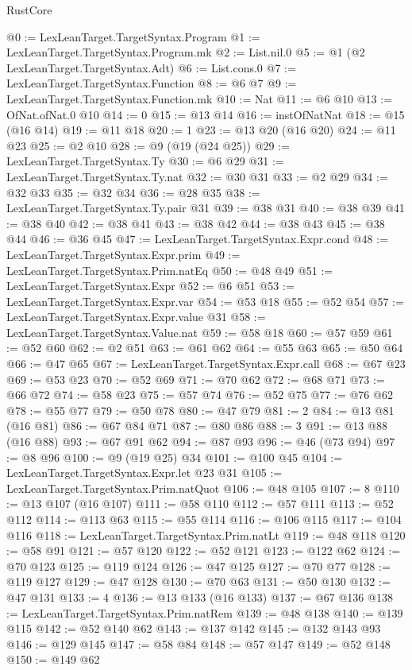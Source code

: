 \begin{lexlean}{RustCore}
\begin{coremodule}
@0 := LexLeanTarget.TargetSyntax.Program
@1 := LexLeanTarget.TargetSyntax.Program.mk
@2 := List.nil.{0}
@5 := @1 (@2 LexLeanTarget.TargetSyntax.Adt)
@6 := List.cons.{0}
@7 := LexLeanTarget.TargetSyntax.Function
@8 := @6 @7
@9 := LexLeanTarget.TargetSyntax.Function.mk
@10 := Nat
@11 := @6 @10
@13 := OfNat.ofNat.{0} @10
@14 := 0
@15 := @13 @14
@16 := instOfNatNat
@18 := @15 (@16 @14)
@19 := @11 @18
@20 := 1
@23 := @13 @20 (@16 @20)
@24 := @11 @23
@25 := @2 @10
@28 := @9 (@19 (@24 @25))
@29 := LexLeanTarget.TargetSyntax.Ty
@30 := @6 @29
@31 := LexLeanTarget.TargetSyntax.Ty.nat
@32 := @30 @31
@33 := @2 @29
@34 := @32 @33
@35 := @32 @34
@36 := @28 @35
@38 := LexLeanTarget.TargetSyntax.Ty.pair @31
@39 := @38 @31
@40 := @38 @39
@41 := @38 @40
@42 := @38 @41
@43 := @38 @42
@44 := @38 @43
@45 := @38 @44
@46 := @36 @45
@47 := LexLeanTarget.TargetSyntax.Expr.cond
@48 := LexLeanTarget.TargetSyntax.Expr.prim
@49 := LexLeanTarget.TargetSyntax.Prim.natEq
@50 := @48 @49
@51 := LexLeanTarget.TargetSyntax.Expr
@52 := @6 @51
@53 := LexLeanTarget.TargetSyntax.Expr.var
@54 := @53 @18
@55 := @52 @54
@57 := LexLeanTarget.TargetSyntax.Expr.value @31
@58 := LexLeanTarget.TargetSyntax.Value.nat
@59 := @58 @18
@60 := @57 @59
@61 := @52 @60
@62 := @2 @51
@63 := @61 @62
@64 := @55 @63
@65 := @50 @64
@66 := @47 @65
@67 := LexLeanTarget.TargetSyntax.Expr.call
@68 := @67 @23
@69 := @53 @23
@70 := @52 @69
@71 := @70 @62
@72 := @68 @71
@73 := @66 @72
@74 := @58 @23
@75 := @57 @74
@76 := @52 @75
@77 := @76 @62
@78 := @55 @77
@79 := @50 @78
@80 := @47 @79
@81 := 2
@84 := @13 @81 (@16 @81)
@86 := @67 @84 @71
@87 := @80 @86
@88 := 3
@91 := @13 @88 (@16 @88)
@93 := @67 @91 @62
@94 := @87 @93
@96 := @46 (@73 @94)
@97 := @8 @96
@100 := @9 (@19 @25) @34
@101 := @100 @45
@104 := LexLeanTarget.TargetSyntax.Expr.let @23 @31
@105 := LexLeanTarget.TargetSyntax.Prim.natQuot
@106 := @48 @105
@107 := 8
@110 := @13 @107 (@16 @107)
@111 := @58 @110
@112 := @57 @111
@113 := @52 @112
@114 := @113 @63
@115 := @55 @114
@116 := @106 @115
@117 := @104 @116
@118 := LexLeanTarget.TargetSyntax.Prim.natLt
@119 := @48 @118
@120 := @58 @91
@121 := @57 @120
@122 := @52 @121
@123 := @122 @62
@124 := @70 @123
@125 := @119 @124
@126 := @47 @125
@127 := @70 @77
@128 := @119 @127
@129 := @47 @128
@130 := @70 @63
@131 := @50 @130
@132 := @47 @131
@133 := 4
@136 := @13 @133 (@16 @133)
@137 := @67 @136
@138 := LexLeanTarget.TargetSyntax.Prim.natRem
@139 := @48 @138
@140 := @139 @115
@142 := @52 @140 @62
@143 := @137 @142
@145 := @132 @143 @93
@146 := @129 @145
@147 := @58 @84
@148 := @57 @147
@149 := @52 @148
@150 := @149 @62

\end{coremodule}
\end{lexlean}
